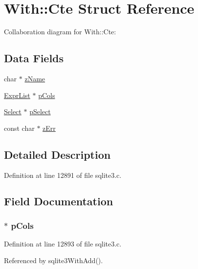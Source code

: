 \hypertarget{struct_with_1_1_cte}{}\section{With\+:\+:Cte Struct Reference}
\label{struct_with_1_1_cte}


Collaboration diagram for With\+:\+:Cte\+:
\subsection*{Data Fields}
\begin{DoxyCompactItemize}
\item 
char $\ast$ \hyperlink{struct_with_1_1_cte_a661118d86ac4127d40bf3be78d92117d}{z\+Name}
\item 
\hyperlink{struct_expr_list}{Expr\+List} $\ast$ \hyperlink{struct_with_1_1_cte_ab2317c070bd5594cd306da5cf5c2b931}{p\+Cols}
\item 
\hyperlink{struct_select}{Select} $\ast$ \hyperlink{struct_with_1_1_cte_ab0e0ccc47de126415a7ad889ff1d228a}{p\+Select}
\item 
const char $\ast$ \hyperlink{struct_with_1_1_cte_af0fff85d0bf7908faa6384390c7b2daa}{z\+Err}
\end{DoxyCompactItemize}


\subsection{Detailed Description}


Definition at line 12891 of file sqlite3.\+c.



\subsection{Field Documentation}
\hypertarget{struct_with_1_1_cte_ab2317c070bd5594cd306da5cf5c2b931}{}
\subsubsection[{p\+Cols}]{$\ast$ p\+Cols}\label{struct_with_1_1_cte_ab2317c070bd5594cd306da5cf5c2b931}


Definition at line 12893 of file sqlite3.\+c.



Referenced by sqlite3\+With\+Add().

